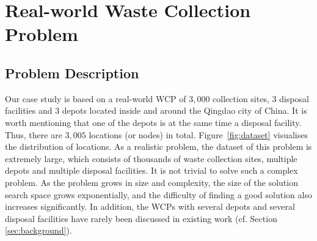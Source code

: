 \documentclass[journal]{IEEEtran}
\begin{document}
\section{Real-world Waste Collection Problem}\label{sec:problem}

\subsection{Problem Description}\label{sec:rwproblem}

Our case study is based on a real-world WCP of $3,000$ collection sites, $3$ disposal facilities and $3$ depots located inside and around the Qingdao city of China. It is worth mentioning that one of the depots is at the same time a disposal facility. Thus, there are $3,005$ locations (or nodes) in total. Figure~\ref{fig:dataset} visualises the distribution of locations. As a realistic problem, the dataset of this problem is extremely large, which consists of thousands of waste collection sites, multiple depots and multiple disposal facilities. It is not trivial to solve such a complex problem. 
As the problem grows in size and complexity, the size of the solution search space grows exponentially, and the difficulty of finding a good solution also increases significantly. In addition, the WCPs with several depots and several disposal facilities have rarely been discussed in existing work (cf. Section \ref{sec:background}). 

\end{document}
